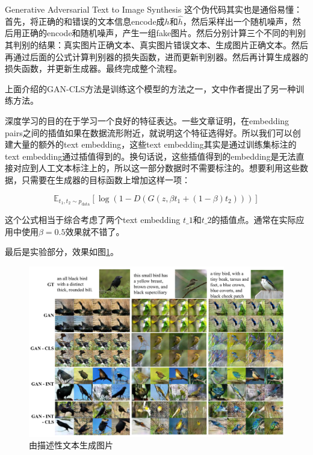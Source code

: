 \documentclass{ctexart}
\begin{document}
\begin{section}{Generative Adversarial Text to Image Synthesis}
		这个伪代码其实也是通俗易懂：
		首先，将正确的和错误的文本信息encode成$h$和$\hat{h}$，然后采样出一个随机噪声，然后用正确的encode和随机噪声，产生一组fake图片。然后分别计算三个不同的判别其判别的结果：真实图片正确文本、真实图片错误文本、生成图片正确文本。然后再通过后面的公式计算判别器的损失函数，进而更新判别器。然后再计算生成器的损失函数，并更新生成器。最终完成整个流程。
		
		上面介绍的GAN-CLS方法是训练这个模型的方法之一，文中作者提出了另一种训练方法。
		
		深度学习的目的在于学习一个良好的特征表达。一些文章证明，在embedding pairs之间的插值如果在数据流形附近，就说明这个特征选得好。所以我们可以创建大量的额外的text
		embedding，这些text embedding其实是通过训练集标注的text
		embedding通过插值得到的。换句话说，这些插值得到的embedding是无法直接对应到人工文本标注上的，所以这一部分数据时不需要标注的。想要利用这些数据，只需要在生成器的目标函数上增加这样一项：
		
		\begin{equation}
			\mathbb{E}_{t_1,t_2\sim p_{\text{data}}}\left[\log(1-D(G(z,\beta t_1+(1-\beta)t_2)))\right]
		\end{equation}
		
		这个公式相当于综合考虑了两个text embedding $t\_1$和$t\_2$的插值点。通常在实际应用中使用$\beta=0.5$效果就不错了。
		
		最后是实验部分，效果如图\ref{fig:image-synthesis-result}。
		\begin{figure}
			\centering
			\includegraphics[width=35em]{figures/image-synthesis-experiment.png}
			\caption{由描述性文本生成图片}
			\label{fig:image-synthesis-result}
		\end{figure}
	\end{section}


 
\end{document}
